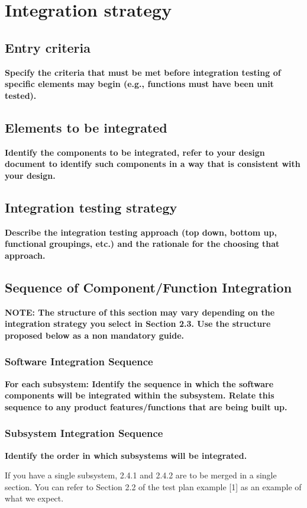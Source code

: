 \chapter{Integration strategy}\label{chap:strategy}

\section{Entry criteria}
\textbf{Specify the criteria that must be met before integration testing of specific elements may begin (e.g., functions must have been unit tested).}



\section{Elements to be integrated}
\textbf{Identify the components to be integrated, refer to your design document to identify such components in a way that is consistent with your design.}



\section{Integration testing strategy}
\textbf{Describe the integration testing approach (top down, bottom up, functional groupings, etc.) and the rationale for the choosing that approach.}

\section{Sequence of Component/Function Integration}
\textbf{NOTE: The structure of this section may vary depending on the integration strategy you select in Section 2.3. Use the structure proposed below as a non mandatory guide.}

\subsection{Software Integration Sequence}
\textbf{For each subsystem: Identify the sequence in which the software components will be integrated within the subsystem. Relate this sequence to any product features/functions that are being built up.}
\subsection{Subsystem Integration Sequence}
\textbf{Identify the order in which subsystems will be integrated.}

If you have a single subsystem, 2.4.1 and 2.4.2 are to be merged in a single section. You can refer to Section 2.2 of the test plan example [1] as an example of what we expect.